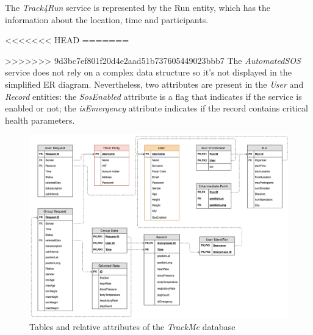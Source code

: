 The \textit{Track4Run} service is represented by the Run entity, which has the information about the location, time and participants.

<<<<<<< HEAD
=======

>>>>>>> 9d3bc7ef801f20d4e2aad51b737605449023bbb7
The \textit{AutomatedSOS} service does not rely on a complex data structure so it’s not displayed in the simplified ER diagram. Nevertheless, two attributes are present in the \textit{User} and \textit{Record} entities: the \textit{SosEnabled} attribute is a flag that indicates if the service is enabled or not; the \textit{isEmergency} attribute indicates if the record contains critical health parameters.

\begin{figure}[H]
\includegraphics[scale=0.34,keepaspectratio]{DD/Pictures/ER-tables.png}
\centering
\caption{Tables and relative attributes of the \textit{TrackMe} database}
\end{figure}